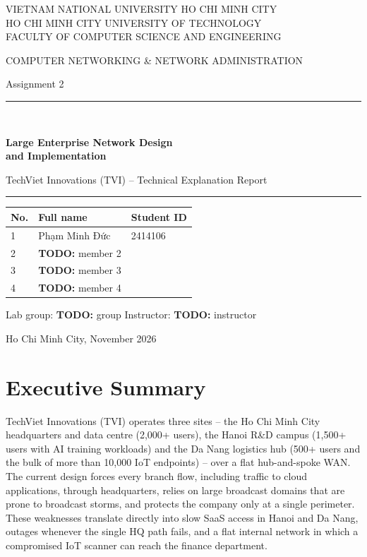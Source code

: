 \documentclass[11pt,a4paper]{article}
\newcommand{\todo}[1]{\colorbox{yellow!40}{\textbf{TODO:} #1}}
\begin{document}
\begin{titlepage}
\centering
{\large VIETNAM NATIONAL UNIVERSITY HO CHI MINH CITY\\
HO CHI MINH CITY UNIVERSITY OF TECHNOLOGY\\
FACULTY OF COMPUTER SCIENCE AND ENGINEERING\par}
\vspace{2.5cm}
{\Large COMPUTER NETWORKING \& NETWORK ADMINISTRATION\par}
\vspace{0.6cm}
{\Large Assignment 2\par}
\vspace{1.0cm}
{\color{tviblue}\rule{\linewidth}{1pt}\\[0.4cm]
{\huge\bfseries Large Enterprise Network Design\\[0.2cm] and Implementation\par}
\vspace{0.3cm}
{\Large TechViet Innovations (TVI) -- Technical Explanation Report\par}
\rule{\linewidth}{1pt}}
\vspace{1.6cm}

\begin{tabular}{lll}
\toprule
\textbf{No.} & \textbf{Full name} & \textbf{Student ID}\\
\midrule
1 & Phạm Minh Đức & 2414106\\
2 & \todo{member 2} & \\
3 & \todo{member 3} & \\
4 & \todo{member 4} & \\
\bottomrule
\end{tabular}

\vspace{1cm}
Lab group: \todo{group} \qquad Instructor: \todo{instructor}

\vfill
{\large Ho Chi Minh City, November 2026\par}
\end{titlepage}

\tableofcontents
\listoffigures
\listoftables
\clearpage

\section{Executive Summary}

TechViet Innovations (TVI) operates three sites -- the Ho Chi Minh City headquarters and data centre (2,000+ users), the Hanoi R\&D campus (1,500+ users with AI training workloads) and the Da Nang logistics hub (500+ users and the bulk of more than 10,000 IoT endpoints) -- over a flat hub-and-spoke WAN. The current design forces every branch flow, including traffic to cloud applications, through headquarters, relies on large broadcast domains that are prone to broadcast storms, and protects the company only at a single perimeter. These weaknesses translate directly into slow SaaS access in Hanoi and Da Nang, outages whenever the single HQ path fails, and a flat internal network in which a compromised IoT scanner can reach the finance department.
\end{document}
